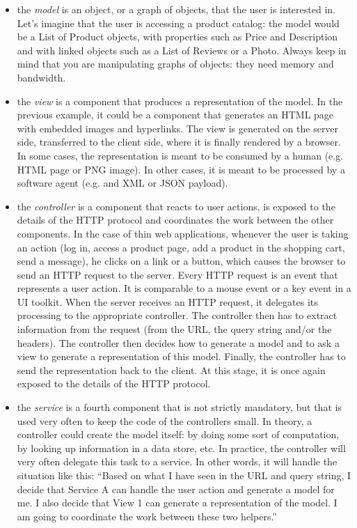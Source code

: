 \begin{itemize}
\item the \emph{model} is an object, or a graph of objects, that the user is interested in. Let's imagine that the user is accessing a product catalog: the model would be a List of Product objects, with properties such as Price and Description and with linked objects such as a List of Reviews or a Photo. Always keep in mind that you are manipulating graphs of objects: they need memory and bandwidth.
\item the \emph{view} is a component that produces a representation of the model. In the previous example, it could be a component that generates an HTML page with embedded images and hyperlinks. The view is generated on the server side, transferred to the client side, where it is finally rendered by a browser. In some cases, the representation is meant to be consumed by a human (e.g. HTML page or PNG image). In other cases, it is meant to be processed by a software agent (e.g. and XML or JSON payload).
\item the \emph{controller} is a component that reacts to user actions, is exposed to the details of the HTTP protocol and coordinates the work between the other components. In the case of thin web applications, whenever the user is taking an action (log in, access a product page, add a product in the shopping cart, send a message), he clicks on a link or a button, which causes the browser to send an HTTP request to the server. Every HTTP request is an event that represents a user action. It is comparable to a mouse event or a key event in a UI toolkit. When the server receives an HTTP request, it delegates its processing to the appropriate controller. The controller then has to extract information from the request (from the URL, the query string and/or the headers). The controller then decides how to generate a model and to ask a view to generate a representation of this model. Finally, the controller has to send the representation back to the client. At this stage, it is once again exposed to the details of the HTTP protocol.
\item the \emph{service} is a fourth component that is not strictly mandatory, but that is used very often to keep the code of the controllers small. In theory, a controller could create the model itself: by doing some sort of computation, by looking up information in a data store, etc. In practice, the controller will very often delegate this task to a service. In other words, it will handle the situation like this: ``Based on what I have seen in the URL and query string, I decide that Service A can handle the user action and generate a model for me. I also decide that View 1 can generate a representation of the model. I am going to coordinate the work between these two helpers.''
\end{itemize}

